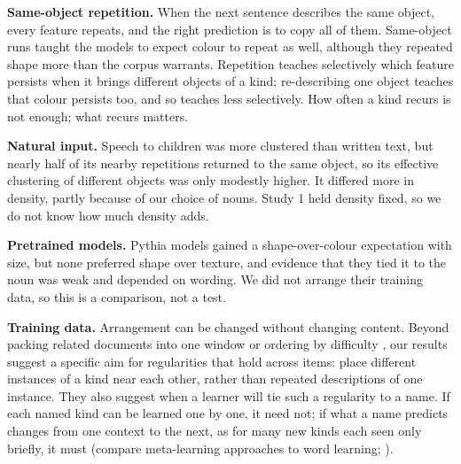 \textbf{Same-object repetition.} When the next sentence describes the same object, every feature repeats, and the right prediction is to copy all of them. Same-object runs taught the models to expect colour to repeat as well, although they repeated shape more than the corpus warrants. Repetition teaches selectively which feature persists when it brings different objects of a kind; re-describing one object teaches that colour persists too, and so teaches less selectively. How often a kind recurs is not enough; what recurs matters.

\textbf{Natural input.} Speech to children was more clustered than written text, but nearly half of its nearby repetitions returned to the same object, so its effective clustering of different objects was only modestly higher. It differed more in density, partly because of our choice of nouns. Study 1 held density fixed, so we do not know how much density adds.

\textbf{Pretrained models.} Pythia models gained a shape-over-colour expectation with size, but none preferred shape over texture, and evidence that they tied it to the noun was weak and depended on wording. We did not arrange their training data, so this is a comparison, not a test.

\textbf{Training data.} Arrangement can be changed without changing content. Beyond packing related documents into one window \cite{shi2024,zhao2024} or ordering by difficulty \cite{diehlmartinez2023}, our results suggest a specific aim for regularities that hold across items: place different instances of a kind near each other, rather than repeated descriptions of one instance. They also suggest when a learner will tie such a regularity to a name. If each named kind can be learned one by one, it need not; if what a name predicts changes from one context to the next, as for many new kinds each seen only briefly, it must (compare meta-learning approaches to word learning; \citealp{wang2025}).

